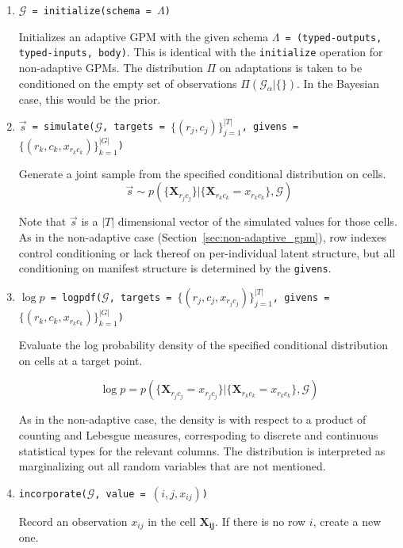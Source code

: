 \documentclass[10pt,letterpaper]{article}
\newcommand{\set}[1]{\{#1\}}
\newcommand{\G}{\mathcal{G}}
\begin{document}
\begin{enumerate}

\item \texttt{$\G$ = initialize(schema = $\Lambda$)}

    Initializes an adaptive GPM with the given schema \texttt{$\Lambda$ =
    (typed-outputs, typed-inputs, body)}.  This is identical with the
    \texttt{initialize} operation for non-adaptive GPMs.  The distribution $\Pi$
    on adaptations is taken to be conditioned on the empty set of observations
    $\Pi(\G_\alpha|\{\})$.  In the Bayesian case, this would be the prior.

\item \texttt{$\vec{s}$ =
    simulate($\G$, targets = $\set{(r_j,c_j)}_{j=1}^{|T|}$, givens
    = $\set{(r_k, c_k, x_{r_kc_k})}_{k=1}^{|G|}$)}

    Generate a joint sample from the specified conditional
    distribution on cells.
    $$
    \vec{s} \sim p( \set{ \mathbf{X}_{r_jc_j} } |
    \set{ \mathbf{X}_{r_kc_k} = x_{r_kc_k} }, \G)
    $$

    Note that $\vec{s}$ is a $|T|$ dimensional vector of the simulated
    values for those cells.  As in the non-adaptive case
    (Section~\ref{sec:non-adaptive_gpm}), row indexes control conditioning
    or lack thereof on per-individual latent structure, but all conditioning
    on manifest structure is determined by the \texttt{givens}.
    
\item \texttt{$\log p$ =
    logpdf($\G$, targets = $\set{(r_j, c_j, x_{r_jc_j})}_{j=1}^{|T|}$,
    givens = $\set{(r_k, c_k, x_{r_kc_k})}_{k=1}^{|G|}$)}

    Evaluate the log probability density of the specified conditional
    distribution on cells at a target point.

    $$
    \log p = p( \set{ \mathbf{X}_{r_jc_j} = x_{r_jc_j} } |
    \set{ \mathbf{X}_{r_kc_k} = x_{r_kc_k} }, \G)
    $$

    As in the non-adaptive case, the density is with respect to a
    product of counting and Lebesgue measures, correspoding to
    discrete and continuous statistical types for the relevant
    columns.  The distribution is interpreted as marginalizing out all
    random variables that are not mentioned.

\item \texttt{incorporate($\G$, value = $(i, j, x_{ij})$)}

    Record an observation $x_{ij}$ in the cell $\mathbf{X_{ij}}$.
    If there is no row $i$, create a new one.


\end{enumerate}
\end{document}

